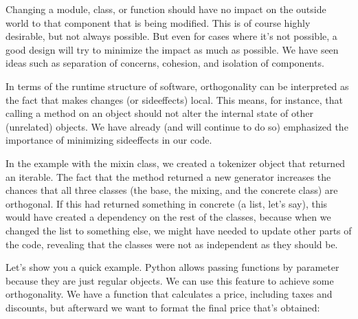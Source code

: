 \documentclass[a4paper,10pt,english]{sphinxmanual}
\begin{document}
Changing a module, class, or function should have no impact on the outside world to that component that is
being modified. This is of course highly desirable, but not always possible. But even for cases where it’s not
possible, a good design will try to minimize the impact as much as possible. We have seen ideas such as
separation of concerns, cohesion, and isolation of components.

In terms of the runtime structure of software, orthogonality can be interpreted as the fact that makes changes
(or side\sphinxhyphen{}effects) local. This means, for instance, that calling a method on an object should not alter the
internal state of other (unrelated) objects. We have already (and will continue to do so) emphasized the
importance of minimizing side\sphinxhyphen{}effects in our code.

In the example with the mixin class, we created a tokenizer object that returned an iterable. The fact that
the  method returned a new generator increases the chances that all three classes (the base,
the mixing, and the concrete class) are orthogonal. If this had returned something in concrete (a list, let’s
say), this would have created a dependency on the rest of the classes, because when we changed the list to
something else, we might have needed to update other parts of the code, revealing that the classes were not as
independent as they should be.

Let’s show you a quick example. Python allows passing functions by parameter because they are just regular
objects. We can use this feature to achieve some orthogonality. We have a function that calculates a price,
including taxes and discounts, but afterward we want to format the final price that’s obtained:
\end{document}
